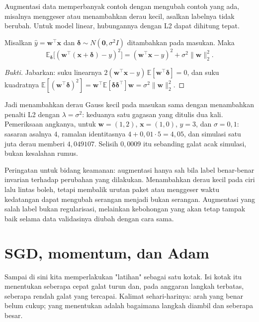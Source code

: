 Augmentasi data memperbanyak contoh dengan mengubah contoh yang ada, misalnya menggeser
atau menambahkan derau kecil, asalkan labelnya tidak berubah. Untuk model linear,
hubungannya dengan L2 dapat dihitung tepat.

\begin{proposisi}
Misalkan $\hat y=\mathbf{w}^{\top}\mathbf{x}$ dan $\boldsymbol{\delta}\sim
N(\mathbf{0},\sigma^2I)$ ditambahkan pada masukan. Maka
\[
\mathbb{E}_{\boldsymbol{\delta}}\bigl[(\mathbf{w}^{\top}(\mathbf{x}+\boldsymbol{\delta})-y)^2\bigr]
=(\mathbf{w}^{\top}\mathbf{x}-y)^2+\sigma^2\|\mathbf{w}\|_2^2 .
\]
\end{proposisi}

\begin{proof}[Bukti]
Jabarkan: suku linearnya $2(\mathbf{w}^{\top}\mathbf{x}-y)\,
\mathbb{E}[\mathbf{w}^{\top}\boldsymbol{\delta}]=0$, dan suku kuadratnya
$\mathbb{E}[(\mathbf{w}^{\top}\boldsymbol{\delta})^2]
=\mathbf{w}^{\top}\mathbb{E}[\boldsymbol{\delta}\boldsymbol{\delta}^{\top}]\mathbf{w}
=\sigma^2\|\mathbf{w}\|_2^2$.
\end{proof}

Jadi menambahkan derau Gauss kecil pada masukan sama dengan menambahkan penalti L2
dengan $\lambda=\sigma^2$: keduanya satu gagasan yang ditulis dua kali. Pemeriksaan
angkanya, untuk $\mathbf{w}=(1,2)$, $\mathbf{x}=(1,0)$, $y=3$, dan $\sigma=0{,}1$:
sasaran asalnya $4$, ramalan identitasnya $4+0{,}01\cdot5=4{,}05$, dan simulasi satu juta
derau memberi $4{,}049107$. Selisih $0{,}0009$ itu sebanding galat acak simulasi, bukan
kesalahan rumus.

Peringatan untuk bidang keamanan: augmentasi hanya sah bila label benar-benar invarian
terhadap perubahan yang dilakukan. Menambahkan derau kecil pada ciri lalu lintas boleh,
tetapi membalik urutan paket atau menggeser waktu kedatangan dapat mengubah serangan
menjadi bukan serangan. Augmentasi yang salah label bukan regularisasi, melainkan
kebohongan yang akan tetap tampak baik selama data validasinya diubah dengan cara sama.

\section{SGD, momentum, dan Adam}

Sampai di sini kita memperlakukan "latihan" sebagai satu kotak. Isi kotak itu menentukan
seberapa cepat galat turun dan, pada anggaran langkah terbatas, seberapa rendah galat yang
tercapai. Kalimat sehari-harinya: arah yang benar belum cukup; yang menentukan adalah
bagaimana langkah diambil dan seberapa besar.

